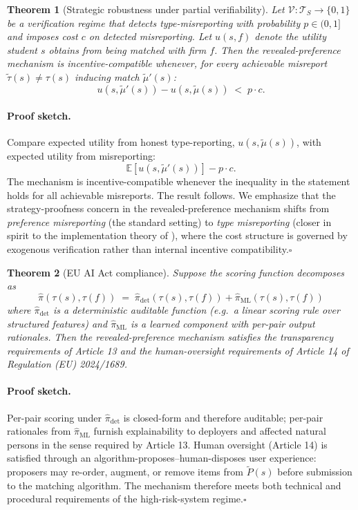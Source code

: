 \documentclass[11pt,a4paper]{article}
\newtheorem{theorem}{Theorem}
\newcommand{\E}{\mathbb{E}}
\newcommand{\TT}{\mathcal{T}}
\begin{document}
\begin{theorem}[Strategic robustness under partial verifiability]
\label{thm:ic}
Let $\mathcal{V}: \TT_S \to \{0,1\}$ be a verification regime that detects type-misreporting with probability $p \in (0,1]$ and imposes cost $c$ on detected misreporting. Let $u(s,f)$ denote the utility student $s$ obtains from being matched with firm $f$. Then the revealed-preference mechanism is incentive-compatible whenever, for every achievable misreport $\widetilde{\tau}(s) \neq \tau(s)$ inducing match $\widetilde{\mu}'(s)$:
\[
    u(s, \widetilde{\mu}'(s)) - u(s, \widetilde{\mu}(s)) \;<\; p \cdot c.
\]
\end{theorem}

\paragraph{Proof sketch.} Compare expected utility from honest type-reporting, $u(s,\widetilde{\mu}(s))$, with expected utility from misreporting:
\[
    \E[u(s,\widetilde{\mu}'(s))] - p \cdot c.
\]
The mechanism is incentive-compatible whenever the inequality in the statement holds for all achievable misreports. The result follows. We emphasize that the strategy-proofness concern in the revealed-preference mechanism shifts from \emph{preference misreporting} (the standard \citet{roth1982} setting) to \emph{type misreporting} (closer in spirit to the implementation theory of \citet{maskin1999}), where the cost structure is governed by exogenous verification rather than internal incentive compatibility.\hfill$\square$

\begin{theorem}[EU AI Act compliance]
\label{thm:eu}
Suppose the scoring function decomposes as
\[
    \widehat{\pi}(\tau(s),\tau(f)) \;=\; \widehat{\pi}_{\mathrm{det}}(\tau(s),\tau(f)) + \widehat{\pi}_{\mathrm{ML}}(\tau(s),\tau(f))
\]
where $\widehat{\pi}_{\mathrm{det}}$ is a deterministic auditable function (e.g.\ a linear scoring rule over structured features) and $\widehat{\pi}_{\mathrm{ML}}$ is a learned component with per-pair output rationales. Then the revealed-preference mechanism satisfies the transparency requirements of Article 13 and the human-oversight requirements of Article 14 of Regulation (EU) 2024/1689.
\end{theorem}

\paragraph{Proof sketch.} Per-pair scoring under $\widehat{\pi}_{\mathrm{det}}$ is closed-form and therefore auditable; per-pair rationales from $\widehat{\pi}_{\mathrm{ML}}$ furnish explainability to deployers and affected natural persons in the sense required by Article 13. Human oversight (Article 14) is satisfied through an algorithm-proposes--human-disposes user experience: proposers may re-order, augment, or remove items from $\widetilde{P}(s)$ before submission to the matching algorithm. The mechanism therefore meets both technical and procedural requirements of the high-risk-system regime.\hfill$\square$
\end{document}
